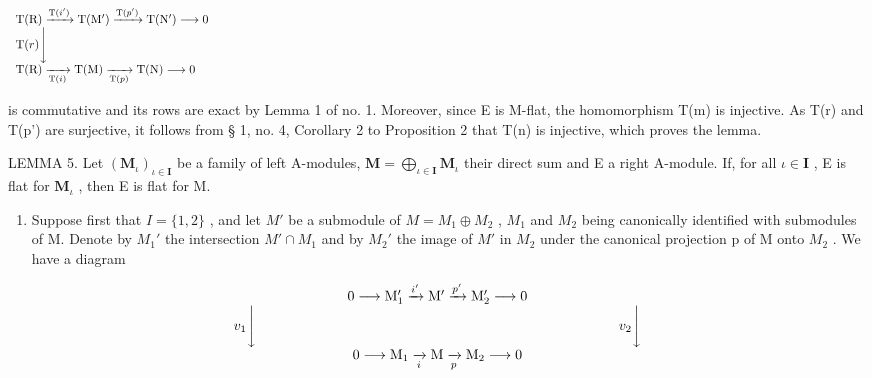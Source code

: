 \[
\begin{array}{l} \mathrm{T} (\mathrm{R}) \xrightarrow {\mathrm{T} (i ^ {\prime})} \mathrm{T} (\mathrm{M} ^ {\prime}) \xrightarrow {\mathrm{T} (p ^ {\prime})} \mathrm{T} (\mathrm{N} ^ {\prime}) \longrightarrow 0 \\ \mathrm{T} (r) \Bigg \downarrow \qquad \qquad \qquad \qquad \qquad \qquad \qquad \qquad \qquad \qquad \qquad \qquad \qquad \qquad \qquad \qquad \qquad \qquad \qquad \qquad \qquad \qquad \qquad \qquad \qquad \qquad \qquad \qquad \qquad \qquad \qquad \qquad \qquad \qquad \\ \mathrm{T} (\mathrm{R}) \xrightarrow [ \mathrm{T} (i) ]{} \mathrm{T} (\mathrm{M}) \xrightarrow [ \mathrm{T} (p) ]{} \mathrm{T} (\mathrm{N}) \longrightarrow 0 \end{array}
\]

is commutative and its rows are exact by Lemma 1 of no. 1. Moreover, since E is M-flat, the homomorphism T(m) is injective. As T(r) and T(p') are surjective, it follows from § 1, no. 4, Corollary 2 to Proposition 2 that T(n) is injective, which proves the lemma.

LEMMA 5. Let \((\mathbf{M}_{\iota})_{\iota \in \mathbf{I}}\) be a family of left A-modules, \(\mathbf{M} = \bigoplus_{\iota \in \mathbf{I}} \mathbf{M}_{\iota}\) their direct sum and E a right A-module. If, for all \(\iota \in \mathbf{I}\) , E is flat for \(\mathbf{M}_{\iota}\) , then E is flat for M.

\begin{enumerate}
\def\labelenumi{(\alph{enumi})}
\tightlist
\item
  Suppose first that \(I = \{1, 2\}\) , and let \(M'\) be a submodule of \(M = M_{1} \oplus M_{2}\) , \(M_{1}\) and \(M_{2}\) being canonically identified with submodules of M. Denote by \(M_{1}'\) the intersection \(M' \cap M_{1}\) and by \(M_{2}'\) the image of \(M'\) in \(M_{2}\) under the canonical projection p of M onto \(M_{2}\) . We have a diagram
\end{enumerate}

\[
\begin{array}{c} 0 \longrightarrow \mathrm{M} _ {1} ^ {\prime} \xrightarrow {i ^ {\prime}} \mathrm{M} ^ {\prime} \xrightarrow {p ^ {\prime}} \mathrm{M} _ {2} ^ {\prime} \longrightarrow 0 \\ v _ {1} \Biggl \downarrow \qquad \qquad \qquad \qquad \qquad \qquad \qquad \qquad \qquad \qquad \qquad \qquad \qquad v _ {2} \Biggl \downarrow \\ 0 \longrightarrow \mathrm{M} _ {1} \xrightarrow [ i ]{} \mathrm{M} \xrightarrow [ p ]{} \mathrm{M} _ {2} \longrightarrow 0 \end{array}
\]

